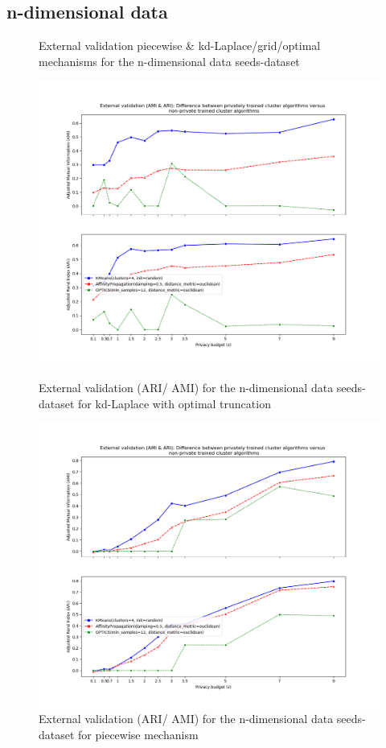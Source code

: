 \subsection{n-dimensional data}
\begin{figure}[H]
    \caption{External validation piecewise \& kd-Laplace/grid/optimal mechanisms for the n-dimensional data seeds-dataset}
    \centering
    \begin{minipage}[c]{0.60\textwidth}
        \includegraphics[width=1\textwidth]{Results/nd-laplace-optimal-truncated/seeds-dataset/ami-and-ari.png}
        \caption{External validation (ARI/ AMI) for the n-dimensional data seeds-dataset for kd-Laplace with optimal truncation}
        \label{fig:external-validation-seeds-dataset_comparison_nd-laplace}
    \end{minipage}
    \begin{minipage}[c]{0.60\textwidth}
        \includegraphics[width=1\textwidth]{Results/nd-piecewise/seeds-dataset/ami-and-ari.png}
        \caption{External validation (ARI/ AMI) for the n-dimensional data seeds-dataset for piecewise mechanism}
        \label{fig:external-validation-seeds-dataset_comparison_nd-piecewise}
    \end{minipage}
\end{figure}
